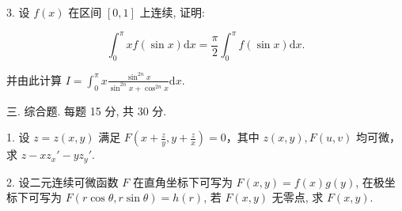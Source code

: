 \documentclass{examcollection}
\renewcommand{\displayformula}[1]{\[#1\]}
\begin{document}
{\begin{minipage}{\textwidth}
3. 设 $f(x)$ 在区间 $[0,1]$ 上连续, 证明:\par
\displayformula{\int_ {0} ^ {\pi} x f (\sin x) \mathrm{d} x = \frac {\pi}{2} \int_ {0} ^ {\pi} f (\sin x) \mathrm{d} x.}\par
并由此计算 $I = \int_0^\pi x\frac{\sin^{2n}x}{\sin^{2n}x + \cos^{2n}x}\mathrm{d}x.$\par
三. 综合题. 每题 15 分, 共 30 分.\par
1. 设 $z = z(x, y)$ 满足 $F\left(x + \frac{z}{y}, y + \frac{z}{x}\right) = 0$，其中 $z(x, y), F(u, v)$ 均可微，求 $z - xz_x' - yz_y'$.\par
2. 设二元连续可微函数 $F$ 在直角坐标下可写为 $F(x, y) = f(x)g(y)$, 在极坐标下可写为 $F(r \cos \theta, r \sin \theta) = h(r)$, 若 $F(x, y)$ 无零点, 求 $F(x, y)$.\par
\end{minipage}}
\ifdim\dimexpr\ht\proofbox+\dp\proofbox\relax>\textheight
\noindent\resizebox{!}{\textheight}{\usebox{\proofbox}}\else\noindent\usebox{\proofbox}\fi\clearpage
\end{document}

